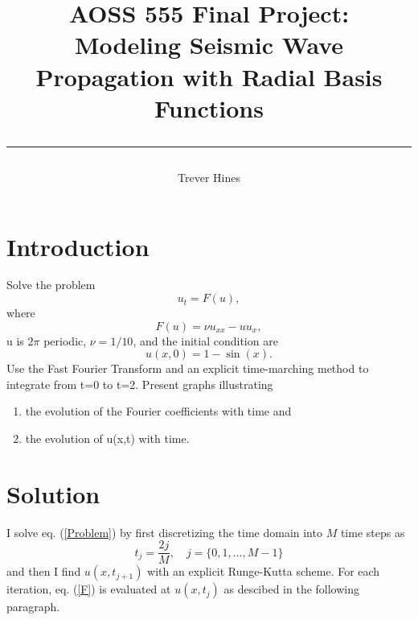 \documentclass[12pt]{article}
\title{	
AOSS 555 Final Project:\\
Modeling Seismic Wave Propagation with Radial Basis Functions\\
\author{Trever Hines}
\rule{\headwidth}{1.0pt}
}
\begin{document}
\maketitle
\section*{Introduction}
Solve the problem
\begin{equation}\label{Problem}
  u_t = F(u),
\end{equation}
where
\begin{equation}\label{F}
  F(u) = \nu u_{xx} - uu_x,
\end{equation}
u is $2\pi$ periodic, $\nu=1/10$, and the initial condition are
\begin{equation}\label{IC}
  u(x,0) = 1 - \sin(x).
\end{equation}
Use the Fast Fourier Transform and an explicit time-marching method to
integrate from t=0 to t=2.  Present graphs illustrating
\begin{enumerate}
\item the evolution of the Fourier coefficients with time and
\item the evolution of u(x,t) with time.
\end{enumerate}

\section*{Solution}

I solve eq. (\ref{Problem}) by first discretizing the time domain into
$M$ time steps as
\begin{equation}
  t_j = \frac{2j}{M}, \quad j=\{0,1,...,M-1\}
\end{equation} 
and then I find $u(x,t_{j+1})$ with an explicit Runge-Kutta scheme.
For each iteration, eq. (\ref{F}) is evaluated at $u(x,t_j)$ as
descibed in the following paragraph.  
\end{document}
